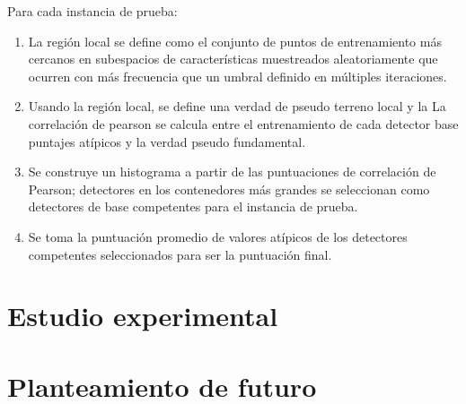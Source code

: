 \documentclass[12pt,twoside]{report}
\begin{document}
\begin{enumerate}
\begin{enumerate}
    Para cada instancia de prueba:
    	\begin{enumerate}
       \item La región local se define como el conjunto de puntos de entrenamiento más cercanos en
    subespacios de características muestreados aleatoriamente que ocurren con más frecuencia que
    un umbral definido en múltiples iteraciones.

    \item Usando la región local, se define una verdad de pseudo terreno local y la
    La correlación de pearson se calcula entre el entrenamiento de cada detector base
    puntajes atípicos y la verdad pseudo fundamental.

\item Se construye un histograma a partir de las puntuaciones de correlación de Pearson; detectores en
    los contenedores más grandes se seleccionan como detectores de base competentes para el
    instancia de prueba.

    \item Se toma la puntuación promedio de valores atípicos de los detectores competentes seleccionados
    para ser la puntuación final.
    	\end{enumerate}
	\end{enumerate}
\end{enumerate}


\chapter*{Estudio experimental}



\chapter*{Planteamiento de futuro}


\medskip

\printbibliography[
heading=bibintoc,
title={Referencias}
]
\end{document}

